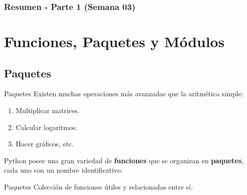 \documentclass[10pt]{beamer}
\begin{document}
\myfront{}

\begin{frame}
  \titlepage
\end{frame}

\begin{frame}
  \frametitle{Resumen - Parte 1 (Semana 03)}
  \tableofcontents
\end{frame}


\section{Funciones, Paquetes y Módulos}

\subsection{Paquetes}

\begin{frame}{Paquetes}
Existen muchas operaciones más avanzadas que la aritmética simple:
\begin{enumerate}
	\item Multiplicar matrices.
	\item Calcular logaritmos.
	\item Hacer gráficos, etc.
\end{enumerate}

Python posee una gran variedad de \textbf{funciones} que se organizan en \textbf{paquetes}, cada uno con un nombre identificativo.

\begin{block}{Paquetes}
Colección de funciones útiles y relacionadas entre sí.
\end{block}
\end{frame}
\end{document}

